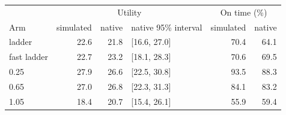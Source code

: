 \begin{tabular}{lrrlrr}
\toprule
 & \multicolumn{3}{c}{Utility} & \multicolumn{2}{c}{On time (\%)} \\
Arm & simulated & native & native 95\% interval & simulated & native \\
\midrule
ladder & 22.6 & 21.8 & [16.6, 27.0] & 70.4 & 64.1 \\
fast ladder & 22.7 & 23.2 & [18.1, 28.3] & 70.6 & 69.5 \\
0.25 & 27.9 & 26.6 & [22.5, 30.8] & 93.5 & 88.3 \\
0.65 & 27.0 & 26.8 & [22.3, 31.3] & 84.1 & 83.2 \\
1.05 & 18.4 & 20.7 & [15.4, 26.1] & 55.9 & 59.4 \\
\bottomrule
\end{tabular}
